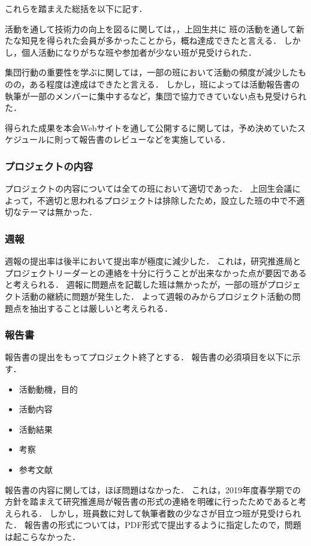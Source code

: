 これらを踏まえた総括を以下に記す．

活動を通して技術力の向上を図るに関しては，\firstGrade{}，上回生共に
班の活動を通して新たな知見を得られた会員が多かったことから，概ね達成できたと言える．
しかし，個人活動になりがちな班や参加者が少ない班が見受けられた．

集団行動の重要性を学ぶに関しては，一部の班において活動の頻度が減少したものの，ある程度は達成はできたと言える．
しかし，班によっては活動報告書の執筆が一部のメンバーに集中するなど，集団で協力できていない点も見受けられた．

得られた成果を本会Webサイトを通して公開するに関しては，予め決めていたスケジュールに則って報告書のレビューなどを実施している．

\subsubsection*{プロジェクトの内容}
プロジェクトの内容については全ての班において適切であった．
上回生会議によって，不適切と思われるプロジェクトは排除したため，設立した班の中で不適切なテーマは無かった．

\subsubsection*{週報}
週報の提出率は後半において提出率が極度に減少した．
これは，研究推進局とプロジェクトリーダーとの連絡を十分に行うことが出来なかった点が要因であると考えられる．
週報に問題点を記載した班は無かったが，一部の班がプロジェクト活動の継続に問題が発生した．
よって週報のみからプロジェクト活動の問題点を抽出することは厳しいと考えられる．

\subsubsection*{報告書}
報告書の提出をもってプロジェクト終了とする．
報告書の必須項目を以下に示す．

\begin{itemize}
\item 活動動機，目的
\item 活動内容
\item 活動結果
\item 考察
\item 参考文献
\end{itemize} 

報告書の内容に関しては，ほぼ問題はなかった．
これは，2019年度春学期での方針を踏まえて研究推進局が報告書の形式の連絡を明確に行ったためであると考えられる．
しかし，班員数に対して執筆者数の少なさが目立つ班が見受けられた．
報告書の形式については，PDF形式で提出するように指定したので，問題は起こらなかった．

